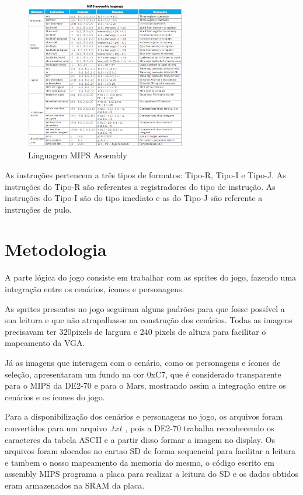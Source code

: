 \documentclass{vgtc}                          %
\begin{document}
\begin{figure}[htbp]
  \centering
  \includegraphics[width=2.76in]{assembly.png}
 \caption{Linguagem MIPS Assembly}
\end{figure}

As instruções pertencem a três tipos de formatos: Tipo-R, Tipo-I e Tipo-J. As instruções do Tipo-R são referentes a registradores do tipo de instrução. As instruções do Tipo-I são do tipo imediato e as do Tipo-J são referente a instruções de pulo.  


\section{Metodologia}

A parte lógica do jogo consiste em trabalhar com as sprites do jogo, fazendo uma integração entre os cenários, ícones e personagens.

As sprites presentes no jogo seguiram alguns padrões para que fosse possível a sua leitura e que não atrapalhasse na construção dos cenários. Todas as imagens precisavam ter 320pixels de largura e 240 pixels de altura para facilitar o mapeamento da VGA. 

Já as imagens que interagem com o cenário, como os personagens e ícones de seleção, apresentaram um fundo na cor 0xC7, que é considerado transparente para o MIPS da DE2-70 e para o Mars, mostrando assim a integração entre os cenários e os ícones do jogo.  

Para a disponibilização dos cenários e personagens no jogo, os arquivos foram convertidos para um arquivo $.txt$ , pois a DE2-70 trabalha reconhecendo os caracteres da tabela ASCII e a partir disso formar a imagem no display. Os arquivos foram alocados no cartao SD de forma sequencial para facilitar a leitura e tambem o nosso mapeamento da memoria do mesmo, o código escrito em assembly MIPS programa a placa para realizar a leitura do SD e os dados obtidos eram armazenados na SRAM da placa. 
\end{document}
